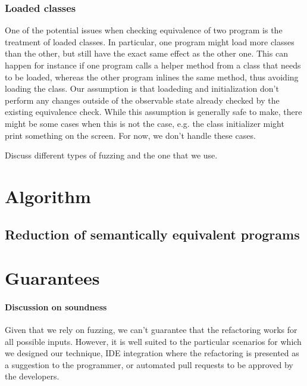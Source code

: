 \documentclass[runningheads,a4paper]{llncs}
\begin{document}







\subsubsection{Loaded classes}

One of the potential issues when checking equivalence of two program
is the treatment of loaded classes. In particular, one program might
load more classes than the other, but still have the exact same effect
as the other one. This can happen for instance if one program calls a
helper method from a class that needs to be loaded, whereas the other
program inlines the same method, thus avoiding loading the class.  Our
assumption is that loadeding and initialization don't perform any
changes outside of the observable state already checked by the
existing equivalence check.  While this assumption is generally safe
to make, there might be some cases when this is not the case, e.g. the
class initializer might print something on the screen. For now, we
don't handle these cases.





Discuss different types of fuzzing and the one that we use.

\section{Algorithm}


\subsection{Reduction of semantically equivalent programs}

\section{Guarantees}

\paragraph{Discussion on soundness} Given that we rely on fuzzing, we can't guarantee that the
refactoring works for all possible inputs. However, it is well suited
to the particular scenarios for which we designed our technique,
IDE integration where the refactoring is presented as a suggestion to the programmer,
or automated pull requests to be approved by the developers.
\end{document}
